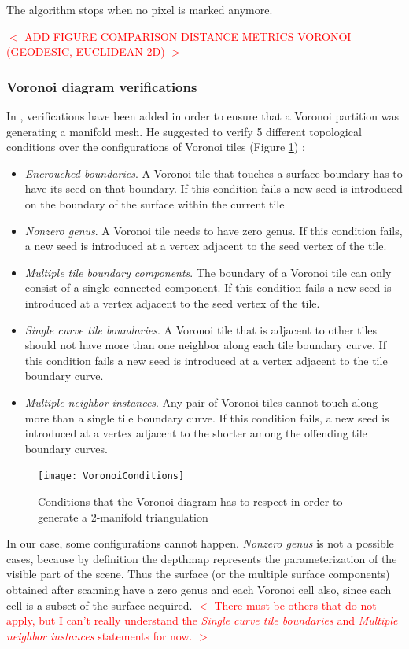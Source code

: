 \documentclass[11pt,fleqn]{book} %
\newcommand{\arnaud}[1]{\textcolor{red}{$<$ #1 $>$}}
\begin{document}
The algorithm stops when no pixel is marked anymore.

\arnaud{ADD FIGURE COMPARISON DISTANCE METRICS VORONOI (GEODESIC, EUCLIDEAN 2D)}

\subsubsection{Voronoi diagram verifications}
In \cite{Gus07}, verifications have been added in order to ensure that a Voronoi partition was generating a manifold mesh.
He suggested to verify 5 different topological conditions over the configurations of Voronoi tiles (Figure \ref{fig:voronoi_conditions}) : 
\begin{itemize}
	\item \textit{Encrouched boundaries}. A Voronoi tile that touches a surface boundary has to have its seed on that boundary. 
	If this condition fails a new seed is introduced on the boundary of the surface within the current tile
	\item \textit{Nonzero genus}. A Voronoi tile needs to have zero genus. If this condition fails, a new seed is introduced at a vertex adjacent to the seed vertex of the tile.
	\item \textit{Multiple tile boundary components}. The boundary of a Voronoi tile can only consist of a single connected component. If this condition fails a new seed is introduced at a vertex adjacent to the seed vertex of the tile.
	\item \textit{Single curve tile boundaries}. A Voronoi tile that is adjacent to other tiles should not have more than one neighbor along each tile boundary curve. If this condition fails a new seed is introduced at a vertex adjacent to the tile boundary curve.
	\item \textit{Multiple neighbor instances}. Any pair of Voronoi tiles cannot touch along more than a single tile boundary curve. If this condition fails, a new seed is introduced at a vertex adjacent to the shorter among the offending tile boundary curves.
\end{itemize}

\begin{figure}[ht]
\centering\texttt{[image: VoronoiConditions]}
\caption{Conditions that the Voronoi diagram has to respect in order to generate a 2-manifold triangulation \cite{Gus07}}
\label{fig:voronoi_conditions}
\end{figure}

In our case, some configurations cannot happen.
\textit{Nonzero genus} is not a possible cases, because by definition the depthmap represents the parameterization of the visible part of the scene. Thus the surface (or the multiple surface components) obtained after scanning have a zero genus and each Voronoi cell also, since each cell is a subset of the surface acquired.
\arnaud{There must be others that do not apply, but I can't really understand the \textit{Single curve tile boundaries} and \textit{Multiple neighbor instances} statements for now.}
\end{document}
